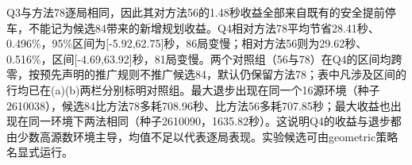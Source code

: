 Q3与方法78逐局相同，因此其对方法56的1.48秒收益全部来自既有的安全提前停车，不能记为候选84带来的新增规划收益。Q4相对方法78平均节省28.41秒、0.496\%，95\%区间为[-5.92,62.75]秒，86局变慢；相对方法56则为29.62秒、0.516\%，区间[-4.69,63.92]秒，81局变慢。两个对照组（56与78）在Q4的区间均跨零，按预先声明的推广规则不推广候选84，默认仍保留方法78；表中凡涉及区间的行均已在(a)(b)两栏分别标明对照组。最大退步出现在同一个16源环境（种子2610038），候选84比方法78多耗708.96秒、比方法56多耗707.85秒；最大收益也出现在同一环境下两法相同（种子2610090，1635.82秒）。这说明Q4的收益与退步都由少数高源数环境主导，均值不足以代表逐局表现。实验候选可由geometric策略名显式运行。
